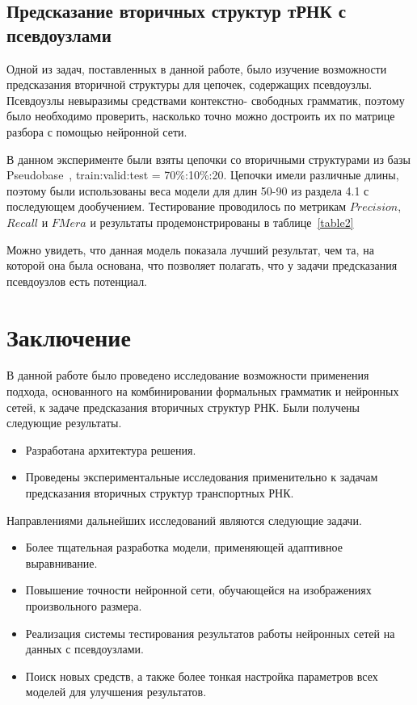 \documentclass[14pt]{matmex-diploma-custom}
\begin{document}
\subsection{Предсказание вторичных структур тРНК с псевдоузлами}
Одной из задач, поставленных в данной работе, было изучение возможности предсказания вторичной структуры для цепочек, содержащих псевдоузлы. Псевдоузлы невыразимы средствами контекстно- \linebreak свободных грамматик, поэтому было необходимо проверить, насколько точно можно достроить их по матрице разбора с помощью нейронной сети.

В данном эксперименте были взяты цепочки со вторичными структурами из базы Pseudobase~\cite{pseudobase}, train:valid:test = 70\%:10\%:20. Цепочки имели различные длины, поэтому были использованы веса модели для длин 50-90 из раздела 4.1 с последующем дообучением. Тестирование проводилось по метрикам $Precision$, $Recall$ и $FMera$ и результаты продемонстрированы в таблице~\ref{table2}



Можно увидеть, что данная модель показала лучший результат, чем та, на которой она была основана, что позволяет полагать, что у задачи предсказания псевдоузлов есть потенциал.

\section*{Заключение}
В данной работе было проведено исследование возможности применения подхода, основанного на комбинировании формальных грамматик и нейронных сетей, к задаче предсказания вторичных структур РНК. Были получены следующие результаты.
\begin{itemize}
    \item Разработана архитектура решения.
    \item Проведены экспериментальные исследования применительно к задачам предсказания вторичных структур транспортных РНК.
\end{itemize}

Направлениями дальнейших исследований являются следующие задачи.
\begin{itemize}
    \item Более тщательная разработка модели, применяющей адаптивное выравнивание.
    \item Повышение точности нейронной сети, обучающейся на изображениях произвольного размера.
    \item Реализация системы тестирования результатов работы нейронных сетей на данных с псевдоузлами.
    \item Поиск новых средств, а также более тонкая настройка параметров всех моделей для улучшения результатов.
\end{itemize}

\setmonofont[Mapping=tex-text]{CMU Typewriter Text}

\renewcommand\refname{Список литературы}

\end{document}
